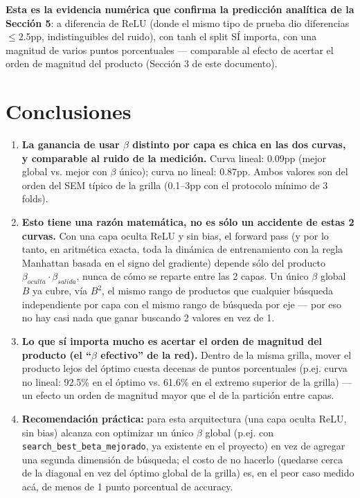 \documentclass[11pt]{article}
\begin{document}
\textbf{Esta es la evidencia numérica que confirma la predicción analítica de la Sección 5}: a diferencia de ReLU (donde el mismo tipo de prueba dio diferencias $\le$2.5pp, indistinguibles del ruido), con tanh el split SÍ importa, con una magnitud de varios puntos porcentuales — comparable al efecto de acertar el orden de magnitud del producto (Sección 3 de este documento).

\section{Conclusiones}

\begin{enumerate}

\item \textbf{La ganancia de usar $\beta$ distinto por capa es chica en las dos curvas, y comparable al ruido de la medición.} Curva lineal: 0.09pp (mejor global vs. mejor con $\beta$ único); curva no lineal: 0.87pp. Ambos valores son del orden del SEM típico de la grilla (0.1--3pp con el protocolo mínimo de 3 folds).

\item \textbf{Esto tiene una razón matemática, no es sólo un accidente de estas 2 curvas.} Con una capa oculta ReLU y sin bias, el forward pass (y por lo tanto, en aritmética exacta, toda la dinámica de entrenamiento con la regla Manhattan basada en el signo del gradiente) depende sólo del producto $\beta_{oculta}\cdot\beta_{salida}$, nunca de cómo se reparte entre las 2 capas. Un único $\beta$ global $B$ ya cubre, vía $B^2$, el mismo rango de productos que cualquier búsqueda independiente por capa con el mismo rango de búsqueda por eje — por eso no hay casi nada que ganar buscando 2 valores en vez de 1.

\item \textbf{Lo que sí importa mucho es acertar el orden de magnitud del producto (el ``$\beta$ efectivo'' de la red).} Dentro de la misma grilla, mover el producto lejos del óptimo cuesta decenas de puntos porcentuales (p.ej. curva no lineal: 92.5\% en el óptimo vs. 61.6\% en el extremo superior de la grilla) — un efecto un orden de magnitud mayor que el de la partición entre capas.

\item \textbf{Recomendación práctica:} para esta arquitectura (una capa oculta ReLU, sin bias) alcanza con optimizar un único $\beta$ global (p.ej. con \texttt{search\_best\_beta\_mejorado}, ya existente en el proyecto) en vez de agregar una segunda dimensión de búsqueda; el costo de no hacerlo (quedarse cerca de la diagonal en vez del óptimo global de la grilla) es, en el peor caso medido acá, de menos de 1 punto porcentual de accuracy.


\end{enumerate}
\end{document}
